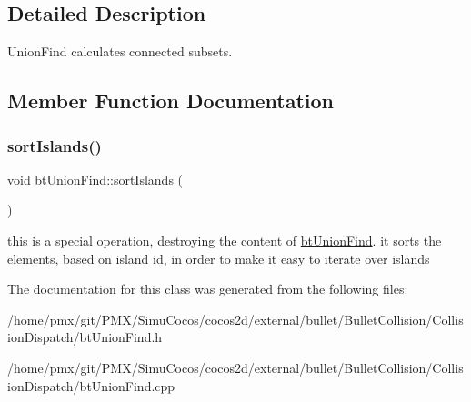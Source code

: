 \subsection{Detailed Description}
Union\+Find calculates connected subsets. 

\subsection{Member Function Documentation}
\mbox{\label{classbtUnionFind_a8bf4647f84d20b033e0d0a7188f3b798}} 
\subsubsection{\texorpdfstring{sort\+Islands()}{sortIslands()}}
{\footnotesize\ttfamily void bt\+Union\+Find\+::sort\+Islands (\begin{DoxyParamCaption}{ }\end{DoxyParamCaption})}

this is a special operation, destroying the content of \hyperlink{classbtUnionFind}{bt\+Union\+Find}. it sorts the elements, based on island id, in order to make it easy to iterate over islands 

The documentation for this class was generated from the following files\+:\begin{DoxyCompactItemize}
\item 
/home/pmx/git/\+P\+M\+X/\+Simu\+Cocos/cocos2d/external/bullet/\+Bullet\+Collision/\+Collision\+Dispatch/bt\+Union\+Find.\+h\item 
/home/pmx/git/\+P\+M\+X/\+Simu\+Cocos/cocos2d/external/bullet/\+Bullet\+Collision/\+Collision\+Dispatch/bt\+Union\+Find.\+cpp\end{DoxyCompactItemize}
